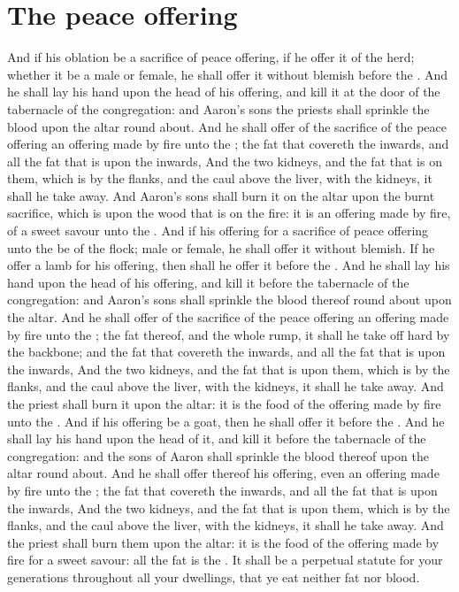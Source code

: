 \section*{The peace offering}
\begin{biblechapter} %
\verse And if his oblation be a sacrifice of peace offering, if he offer it of the herd; whether it be a male or female, he shall offer it without blemish before the \LORD.
\verse And he shall lay his hand upon the head of his offering, and kill it at the door of the tabernacle of the congregation: and Aaron's sons the priests shall sprinkle the blood upon the altar round about.
\verse And he shall offer of the sacrifice of the peace offering an offering made by fire unto the \LORD; the fat that covereth the inwards, and all the fat that is upon the inwards,
\verse And the two kidneys, and the fat that is on them, which is by the flanks, and the caul above the liver, with the kidneys, it shall he take away.
\verse And Aaron's sons shall burn it on the altar upon the burnt sacrifice, which is upon the wood that is on the fire: it is an offering made by fire, of a sweet savour unto the \LORD.
\verse And if his offering for a sacrifice of peace offering unto the \LORD be of the flock; male or female, he shall offer it without blemish.
\verse If he offer a lamb for his offering, then shall he offer it before the \LORD.
\verse And he shall lay his hand upon the head of his offering, and kill it before the tabernacle of the congregation: and Aaron's sons shall sprinkle the blood thereof round about upon the altar.
\verse And he shall offer of the sacrifice of the peace offering an offering made by fire unto the \LORD; the fat thereof, and the whole rump, it shall he take off hard by the backbone; and the fat that covereth the inwards, and all the fat that is upon the inwards,
\verse And the two kidneys, and the fat that is upon them, which is by the flanks, and the caul above the liver, with the kidneys, it shall he take away.
\verse And the priest shall burn it upon the altar: it is the food of the offering made by fire unto the \LORD.
\verse And if his offering be a goat, then he shall offer it before the \LORD.
\verse And he shall lay his hand upon the head of it, and kill it before the tabernacle of the congregation: and the sons of Aaron shall sprinkle the blood thereof upon the altar round about.
\verse And he shall offer thereof his offering, even an offering made by fire unto the \LORD; the fat that covereth the inwards, and all the fat that is upon the inwards,
\verse And the two kidneys, and the fat that is upon them, which is by the flanks, and the caul above the liver, with the kidneys, it shall he take away.
\verse And the priest shall burn them upon the altar: it is the food of the offering made by fire for a sweet savour: all the fat is the \LORDs.
\verse It shall be a perpetual statute for your generations throughout all your dwellings, that ye eat neither fat nor blood.
\end{biblechapter}

